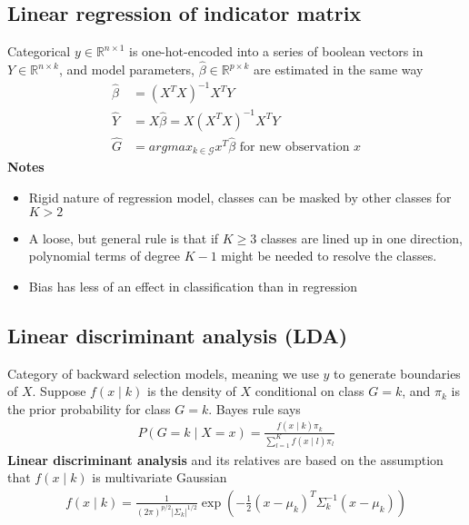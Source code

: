 \documentclass{article}
\newcommand{\abs}[1]{\lvert#1\rvert}
\begin{document}
\subsection{Linear regression of indicator matrix}
Categorical $y \in \mathbb{R}^{n \times 1}$ is one-hot-encoded into a series of boolean vectors in $Y \in \mathbb{R}^{n\times k}$, and model parameters, $\hat{\beta} \in \mathbb{R}^{p \times k}$ are estimated in the same way
\begin{align*}
  \hat{\beta} &= (X^TX)^{-1}X^TY\\
  \hat{Y} &= X\hat{\beta} = X(X^TX)^{-1}X^TY\\
  \hat{G} &= argmax_{k\in \mathcal{G}} x^T\hat{\beta} \textrm{ for new observation } x
\end{align*}
\textbf{Notes}
\begin{itemize}
  \item Rigid nature of regression model, classes can be masked by other classes for $K > 2$
  \item A loose, but general rule is that if $K \geq 3$ classes are lined up in one direction, polynomial terms of degree $K - 1$ might be needed to resolve the classes. 
  \item Bias has less of an effect in classification than in regression
\end{itemize}


\subsection{Linear discriminant analysis (LDA)}
Category of backward selection models, meaning we use $y$ to generate boundaries of $X$. Suppose $f(x \mid k)$ is the density of $X$ conditional on class $G=k$, and $\pi_k$ is the prior probability for class $G=k$. Bayes rule says
\begin{align*}
  P(G=k \mid X=x) = \frac{f(x\mid k) \pi_k}{\sum_{l=1}^Kf(x \mid l)\pi_l}
\end{align*}
\textbf{Linear discriminant analysis} and its relatives are based on the assumption that $f(x \mid k)$ is multivariate Gaussian
\begin{align*}
  f(x \mid k) = \frac{1}{(2\pi)^{p/2}\abs{\Sigma_k}^{1/2}}\exp(-\frac{1}{2}(x - \mu_k)^T \Sigma_k^{-1}(x - \mu_k))
\end{align*}
\end{document}
